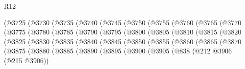 \begin{lexlean}{R12}
\begin{coremodule}
                (@3725
                  (@3730
                    (@3735
                      (@3740
                        (@3745
                          (@3750
                            (@3755
                              (@3760
                                (@3765
                                  (@3770
                                    (@3775
                                      (@3780
                                        (@3785
                                          (@3790
                                            (@3795
                                              (@3800
                                                (@3805
                                                  (@3810
                                                    (@3815
                                                      (@3820
                                                        (@3825
                                                          (@3830
                                                            (@3835
                                                              (@3840
                                                                (@3845
                                                                  (@3850
                                                                    (@3855
                                                                      (@3860
                                                                        (@3865
                                                                          (@3870
                                                                            (@3875
                                                                              (@3880
                                                                                (@3885
                                                                                  (@3890
                                                                                    (@3895
                                                                                      (@3900
                                                                                        (@3905
                                                                                          (@838
                                                                                            (@212
                                                                                              @3906
                                                                                              (@215
                                                                                                @3906))

\end{coremodule}
\end{lexlean}
